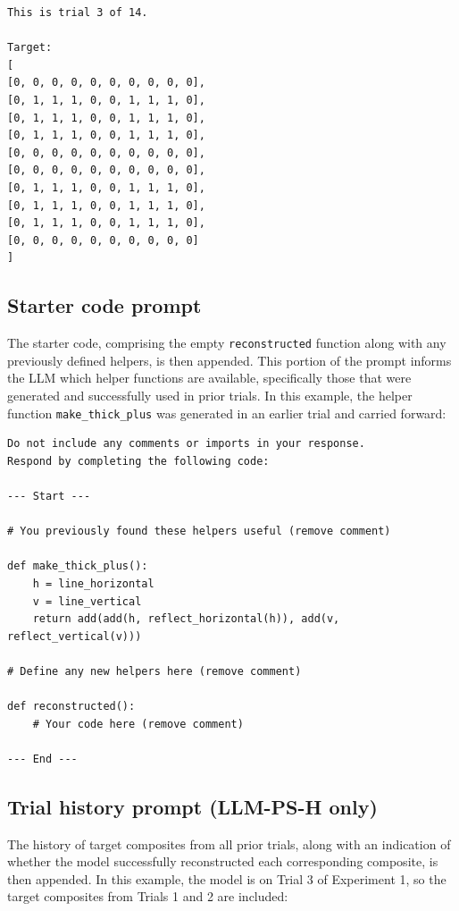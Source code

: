 \documentclass{article}
\begin{document}
\begin{verbatim}
This is trial 3 of 14.

Target:
[
[0, 0, 0, 0, 0, 0, 0, 0, 0, 0],
[0, 1, 1, 1, 0, 0, 1, 1, 1, 0],
[0, 1, 1, 1, 0, 0, 1, 1, 1, 0],
[0, 1, 1, 1, 0, 0, 1, 1, 1, 0],
[0, 0, 0, 0, 0, 0, 0, 0, 0, 0],
[0, 0, 0, 0, 0, 0, 0, 0, 0, 0],
[0, 1, 1, 1, 0, 0, 1, 1, 1, 0],
[0, 1, 1, 1, 0, 0, 1, 1, 1, 0],
[0, 1, 1, 1, 0, 0, 1, 1, 1, 0],
[0, 0, 0, 0, 0, 0, 0, 0, 0, 0]
]
\end{verbatim} 

\subsection{Starter code prompt}

The starter code, comprising the empty \verb|reconstructed| function along with any previously defined helpers, is then appended. This portion of the prompt informs the LLM which helper functions are available, specifically those that were generated and successfully used in prior trials. In this example, the helper function \verb|make_thick_plus| was generated in an earlier trial and carried forward:

\begin{verbatim}
Do not include any comments or imports in your response. 
Respond by completing the following code:

--- Start ---

# You previously found these helpers useful (remove comment)

def make_thick_plus():
    h = line_horizontal
    v = line_vertical
    return add(add(h, reflect_horizontal(h)), add(v, reflect_vertical(v)))

# Define any new helpers here (remove comment)

def reconstructed():
    # Your code here (remove comment)

--- End ---
\end{verbatim}

\subsection{Trial history prompt (LLM-PS-H only)}

The history of target composites from all prior trials, along with an indication of whether the model successfully reconstructed each corresponding composite, is then appended. In this example, the model is on Trial 3 of Experiment 1, so the target composites from Trials 1 and 2 are included:
\end{document}
